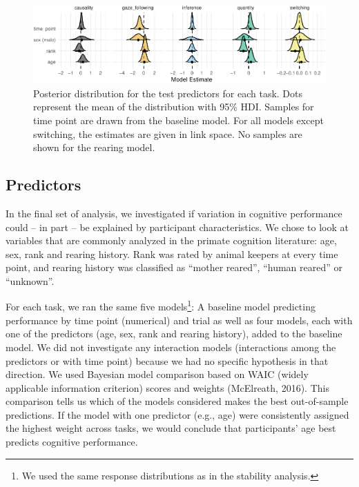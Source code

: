 \documentclass[10pt, letterpaper]{article}
\newenvironment{CodeChunk}{}{}
\begin{document}
\begin{CodeChunk}
\begin{figure}[h]

{\centering \includegraphics{figs/predplot-1} 

}

\caption[Posterior distribution for the test predictors for each task]{Posterior distribution for the test predictors for each task. Dots represent the mean of the distribution with 95\% HDI. Samples for time point are drawn from the baseline model. For all models except switching, the estimates are given in link space. No samples are shown for the rearing model.}\label{fig:predplot}
\end{figure}
\end{CodeChunk}

\hypertarget{predictors}{%
\subsection{Predictors}\label{predictors}}

In the final set of analysis, we investigated if variation in cognitive
performance could -- in part -- be explained by participant
characteristics. We chose to look at variables that are commonly
analyzed in the primate cognition literature: age, sex, rank and rearing
history. Rank was rated by animal keepers at every time point, and
rearing history was classified as ``mother reared'', ``human reared'' or
``unknown''.

For each task, we ran the same five models\footnote{We used the same
  response distributions as in the stability analysis.}: A baseline
model predicting performance by time point (numerical) and trial as well
as four models, each with one of the predictors (age, sex, rank and
rearing history), added to the baseline model. We did not investigate
any interaction models (interactions among the predictors or with time
point) because we had no specific hypothesis in that direction. We used
Bayesian model comparison based on WAIC (widely applicable information
criterion) scores and weights (McElreath, 2016). This comparison tells
us which of the models considered makes the best out-of-sample
predictions. If the model with one predictor (e.g., age) were
consistently assigned the highest weight across tasks, we would conclude
that participants' age best predicts cognitive performance.
\end{document}

